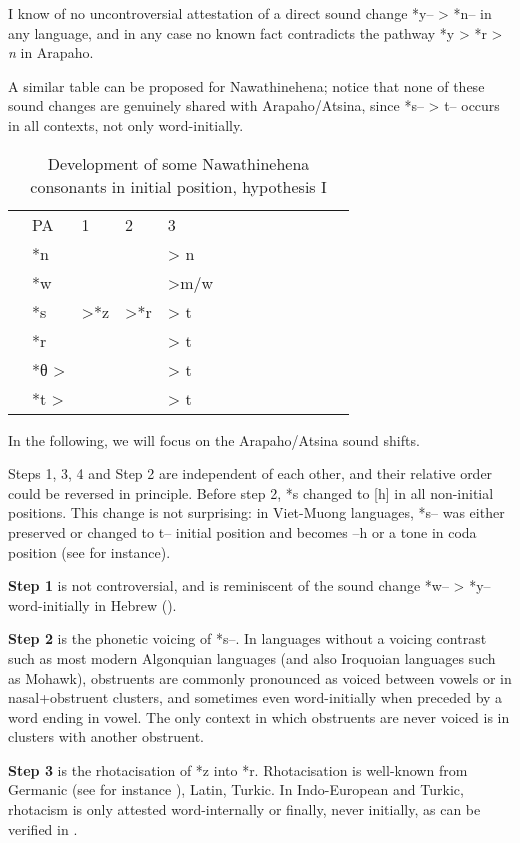 \documentclass[oldfontcommands,oneside,a4paper,11pt]{article}
\newcommand{\grise}[1]{\cellcolor{lightgray}\textbf{#1}}
\begin{document}
I know of no uncontroversial attestation of a direct sound change *y-- > *n--  in any language, and in any case no known fact contradicts the pathway *y > *r > \textit{n} in Arapaho. 

A similar table can be proposed for Nawathinehena; notice that none of these sound changes are genuinely shared with Arapaho/Atsina, since *s-- > t-- occurs in all contexts, not only word-initially.
\begin{table}[H]
\caption{Development of some Nawathinehena  consonants in initial position, hypothesis I}  \centering
\begin{tabular}{lllllllllllll}
&PA & 1 & 2 & 3 \\
&*n   &&& > n\\
&*w &&&>m/w\\
&*s    &>*z &>*r	 \grise{}&> t \grise{}\\
&*r	    	  & 	& 	  &> t \grise{}\\
&*θ >   &&&> t\grise{}\ \\
&*t >  &&&> t \\
\end{tabular}
\end{table}
In the following, we will focus on the Arapaho/Atsina sound shifts.

Steps 1, 3, 4 and Step  2 are independent of each other, and their relative order could be reversed in principle. Before step 2, *s changed to [h] in all non-initial positions. This change is not surprising: in Viet-Muong languages, *s-- was either preserved or changed to t-- initial position and becomes --h or a tone in coda position (see \citealt{ferlus98vm} for instance).

\textbf{Step 1} is not controversial, and is reminiscent of the sound change *w-- > *y-- word-initially in Hebrew (\citealt[§26]{jouon06}). 

\textbf{Step 2} is the phonetic voicing of *s--. In languages without a voicing contrast such as   most modern Algonquian languages (and also Iroquoian languages such as Mohawk), obstruents are commonly pronounced as voiced between vowels or in nasal+obstruent clusters, and sometimes even word-initially when preceded by a word ending in vowel. The only context in which obstruents are never voiced is in clusters with another obstruent. 

\textbf{Step 3} is the rhotacisation of *z into  *r. Rhotacisation is well-known from Germanic (see for instance \citealt[27]{lass94oe}), Latin, Turkic. In Indo-European and Turkic, rhotacism is only attested word-internally or finally, never initially, as can be verified in  \citet[80-81]{kuemmel07wandel}.
\end{document}

